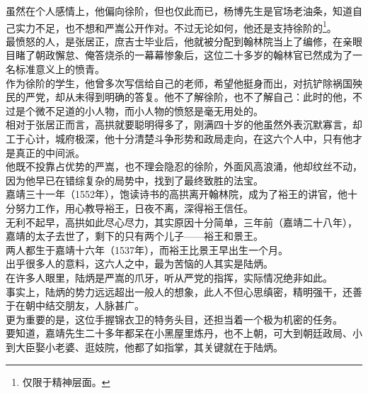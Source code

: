 \begin{multicols}{\theparacolNo}
虽然在个人感情上，他偏向徐阶，但也仅此而已，杨博先生是官场老油条，知道自己实力不足，也不想和严嵩公开作对。不过无论如何，他还是支持徐阶的\footnote{仅限于精神层面。}。\\

最愤怒的人，是张居正，庶吉士毕业后，他就被分配到翰林院当上了编修，在亲眼目睹了朝政懈怠、俺答烧杀的一幕幕惨象后，这位二十多岁的翰林官已然成为了一名标准意义上的愤青。\\

作为徐阶的学生，他曾多次写信给自己的老师，希望他挺身而出，对抗铲除祸国殃民的严党，却从未得到明确的答复。他不了解徐阶，也不了解自己：此时的他，不过是个微不足道的小人物，而小人物的愤怒是毫无用处的。\\

相对于张居正而言，高拱就要聪明得多了，刚满四十岁的他虽然外表沉默寡言，却工于心计，城府极深，他十分清楚斗争形势和政局走向，在这六个人中，只有他才是真正的中间派。\\

他既不投靠占优势的严嵩，也不理会隐忍的徐阶，外面风高浪涌，他却纹丝不动，因为他早已在错综复杂的局势中，找到了最终致胜的法宝。\\

嘉靖三十一年（1552年），饱读诗书的高拱离开翰林院，成为了裕王的讲官，他十分努力工作，用心教导裕王，日夜不离，深得裕王信任。\\

无利不起早，高拱如此尽心尽力，其实原因十分简单，三年前（嘉靖二十八年），嘉靖的太子去世了，剩下的只有两个儿子——裕王和景王。\\

两人都生于嘉靖十六年（1537年），而裕王比景王早出生一个月。\\

出乎很多人的意料，这六人之中，最为苦恼的人其实是陆炳。\\

在许多人眼里，陆炳是严嵩的爪牙，听从严党的指挥，实际情况绝非如此。\\

事实上，陆炳的势力远远超出一般人的想象，此人不但心思缜密，精明强干，还善于在朝中结交朋友，人脉甚广。\\

更为重要的是，这位手握锦衣卫的特务头目，还担当着一个极为机密的任务。\\

要知道，嘉靖先生二十多年都呆在小黑屋里炼丹，也不上朝，可大到朝廷政局、小到大臣娶小老婆、逛妓院，他都了如指掌，其关键就在于陆炳。\\


\end{multicols}
